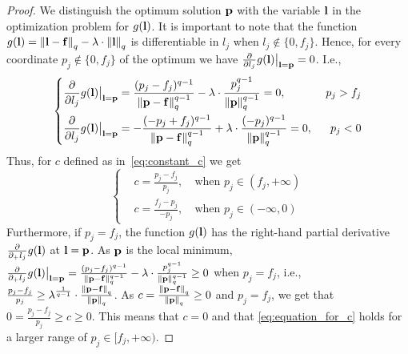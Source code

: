 \begin{proof}
We distinguish the optimum solution $\mathbf{p}$ with the variable $\mathbf{l}$ in the optimization problem for $g(\mathbf{l})$. It is important to note that the function $g(\mathbf{l})=\left\Vert \mathbf{l}-\mathbf{f}\right\Vert_{q}-\lambda\cdot\left\Vert \mathbf{l}\right\Vert_{q}$ is differentiable in $l_j$ when $l_j\notin \{0,f_j\}$. Hence, for every coordinate $p_j\notin\{0,f_j\}$ of the optimum  we have $
\frac{\partial}{\partial l_j}g(\mathbf{l})\big\vert_{\mathbf{l}=\mathbf{p}}=0
$. I.e., 
\begin{equation*}
    \left\{
    \begin{aligned}
    &\frac{\partial}{\partial l_j}g(\mathbf{l})\big\vert_{\mathbf{l}=\mathbf{p}}=\frac{(p_j-f_j)^{q-1}}{\left\Vert \mathbf{p}-\mathbf{f}\right\Vert_{q}^{q-1}}-\lambda\cdot\frac{p_j^{q-1}}{\left\Vert \mathbf{p}\right\Vert_{q}^{q-1}}=0,\ &p_j>f_j\\
    &\frac{\partial}{\partial l_j}g(\mathbf{l})\big\vert_{\mathbf{l}=\mathbf{p}}=-\frac{(-p_j+f_j)^{q-1}}{\left\Vert \mathbf{p}-\mathbf{f}\right\Vert_{q}^{q-1}}+\lambda\cdot\frac{(-p_j)^{q-1}}{\left\Vert \mathbf{p}\right\Vert_{q}^{q-1}}=0,\  &p_j< 0
    \end{aligned}
    \right.
\end{equation*}
Thus, for $c$ defined as in~\eqref{eq:constant_c} we get 
\begin{equation}
\label{eq:equation_for_c}
    \left\{
    \begin{aligned}
    &c = \frac{p_j-f_j}{p_j},\ &\text{when }p_j\in (f_j,+\infty)\\
    &c = \frac{f_j-p_j}{-p_j},\  &\text{when }p_j\in (-\infty,0)
    \end{aligned}
    \right.
\end{equation}
Furthermore, if $p_j=f_j$, the function $g(\mathbf{l})$ has the right-hand partial derivative $\frac{\partial}{\partial_{+}l_j}g(\mathbf{l})$ at $\mathbf{l}=\mathbf{p}$. As $\mathbf{p}$ is the local minimum, $\frac{\partial}{\partial_+ l_j}g(\mathbf{l})\big\vert_{\mathbf{l}=\mathbf{p}}=\frac{(p_j-f_j)^{q-1}}{\left\Vert \mathbf{p}-\mathbf{f}\right\Vert_{q}^{q-1}}-\lambda\cdot\frac{p_j^{q-1}}{\left\Vert \mathbf{p}\right\Vert_{q}^{q-1}}\ge 0$ when $p_j=f_j$, i.e., 
$
\frac{p_j-f_j}{p_j}\ge
\lambda^{\frac{1}{q-1}}\cdot\frac{\left\Vert \mathbf{p}-\mathbf{f}\right\Vert_{q}}{\left\Vert \mathbf{p}\right\Vert_{q}}
$. As $c=\frac{\left\Vert \mathbf{p}-\mathbf{f}\right\Vert_{q}}{\left\Vert \mathbf{p}\right\Vert_{q}}\ge 0$ and $p_j=f_j$, we get that $0=\frac{p_j-f_j}{p_j}\ge c\ge 0$. This means that $c=0$ and that \eqref{eq:equation_for_c} holds for a larger range of $p_j\in[f_j,+\infty)$.


\end{proof}
